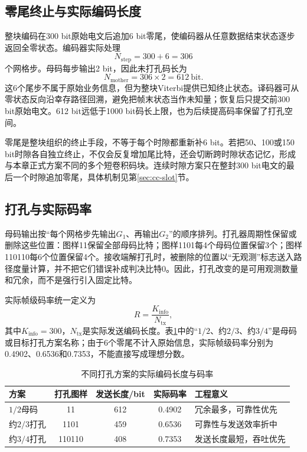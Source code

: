 \subsection{零尾终止与实际编码长度}

整块编码在300 bit原始电文后追加6 bit零尾，使编码器从任意数据结束状态逐步返回全零状态。编码器实际处理
\begin{equation}
  N_{\mathrm{step}}=300+6=306
\end{equation}
个网格步。母码每步输出2 bit，因此未打孔码长为
\begin{equation}
  N_{\mathrm{mother}}=306\times2=612~\mathrm{bit}.
\end{equation}
这6个尾步不属于原始业务信息，但为整块Viterbi提供已知终止状态。译码器可从零状态反向沿幸存路径回溯，避免把帧末状态当作未知量；恢复后只提交前300 bit原始电文。612 bit远低于1000 bit码长上限，也为后续提高码率保留了打孔空间。

零尾是整块组织的终止手段，不等于每个时隙都重新补6 bit。若把50、100或150 bit时隙各自独立终止，不仅会反复增加尾比特，还会切断跨时隙状态记忆，形成与本章正式方案不同的多个短卷积码块。连续时隙方案只在整封300 bit电文的最后一个时隙追加零尾，具体机制见第\ref{sec:cc-slot}节。

\subsection{打孔与实际码率}

母码输出按“每个网格步先输出$G_1$、再输出$G_2$”的顺序排列。打孔器周期性保留或删除这些位置：图样11保留全部母码比特；图样1101每4个母码位置保留3个；图样110110每6个位置保留4个。接收端解打孔时，被删除的位置以“无观测”标志送入路径度量计算，并不把它们错误补成判决比特0。因此，打孔改变的是可用观测数量和冗余，而不是强行引入固定比特。

实际帧级码率统一定义为
\begin{equation}
  R=\frac{K_{\mathrm{info}}}{N_{\mathrm{tx}}},
\end{equation}
其中$K_{\mathrm{info}}=300$，$N_{\mathrm{tx}}$是实际发送编码长度。表\ref{tab:cc-puncturing}中的“$1/2$、约$2/3$、约$3/4$”是母码或目标打孔方案名称；由于6个零尾不计入原始信息，实际帧级码率分别为0.4902、0.6536和0.7353，不能直接写成理想分数。

\begin{table}[htbp]
  \centering
  \small
  \caption{不同打孔方案的实际编码长度与码率}
  \label{tab:cc-puncturing}
  \begin{tabular}{p{}c c c p{}}
    \toprule
    方案 & 打孔图样 & 发送长度/bit & 实际码率 & 工程意义 \\
    \midrule
    $1/2$母码 & 11 & 612 & 0.4902 & 冗余最多，可靠性优先 \\
    约$2/3$打孔 & 1101 & 459 & 0.6536 & 可靠性与发送效率折中 \\
    约$3/4$打孔 & 110110 & 408 & 0.7353 & 发送长度最短，吞吐优先 \\
    \bottomrule
  \end{tabular}
\end{table}

